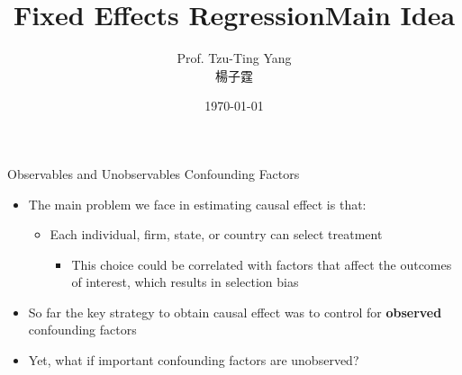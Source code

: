 \documentclass[dvipsnames,hyperref={pdfpagelabels=false}]{beamer}
\title[]  
{Fixed Effects Regression}
\author 
{Prof. Tzu-Ting Yang  \\ 楊子霆}
\institute{Institute of Economics, Academia Sinica  \\ 中央研究院經濟研究所}
\date
{\today}
\begin{document}
	
	
	\begin{frame}{}
	\titlepage
\end{frame}





\begin{frame}{Observables and Unobservables Confounding Factors}
	\begin{itemize} 
		
		\item The main problem we face in estimating causal effect is that:
						\vspace{0.2cm}
			\begin{itemize} 
		\item Each individual, firm, state, or country can select treatment 
						\vspace{0.2cm}
						\begin{itemize} 			
		\item This choice could be correlated with factors that affect the outcomes of interest, which results in selection bias
						\vspace{0.2cm}
									\end{itemize}
			\end{itemize}
		\item So far the key strategy to obtain causal effect was to control for \textbf{observed} confounding factors
								\vspace{0.2cm}
		
		\item Yet, what if important confounding factors are unobserved?
		
		
		
		
		
	\end{itemize}
\end{frame}


\title[]  
{Main Idea}


\author 
{}

\institute{}
\end{document}
